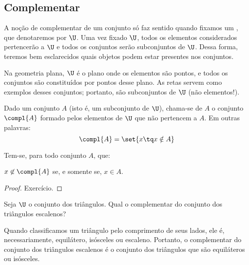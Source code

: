 \subsection{Complementar}
A noção de complementar de um conjunto só faz sentido quando fixamos um , que denotaremos por $\U$.
Uma vez fixado $\U$, todos os elementos considerados pertencerão a $\U$ e todos os conjuntos serão subconjuntos de $\U$.
Dessa forma, teremos bem esclarecidos quais objetos podem estar presentes nos conjuntos.

\begin{example}
Na geometria plana, $\U$ é o plano onde os elementos são pontos, e todos os conjuntos são constituídos por pontos desse plano.
As retas servem como exemplos desses conjuntos; portanto, são subconjuntos de $\U$ (não elementos!).
\end{example}

\begin{definition}[Complementar]
\label{def:complementar}
Dado um conjunto $A$ (isto é, um subconjunto de $\U$), chama-se  de $A$ o conjunto $\compl{A}$ formado pelos elementos de $\U$ que não pertencem a $A$.
Em outras palavras:
$$
\compl{A} = \set{x \tq x \notin A}
$$
\end{definition}

\begin{proposition}
\label{prop:def-complementar}
Tem-se, para todo conjunto $A$, que:
\begin{center}
    $x \not \in \compl{A}$ se, e somente se, $x \in A$.
\end{center}
\end{proposition}

\begin{proof}
Exercício.
\end{proof}

\begin{example}
Seja $\U$ o conjunto dos triângulos.
Qual o complementar do conjunto dos triângulos escalenos?
\end{example}

\begin{solution}
	Quando classificamos um triângulo pelo comprimento de seus lados, ele é, necessariamente, equilátero, isósceles ou escaleno.
	Portanto, o complementar do conjunto dos triângulos escalenos é o conjunto dos triângulos que são equiláteros ou isósceles.
\end{solution}

